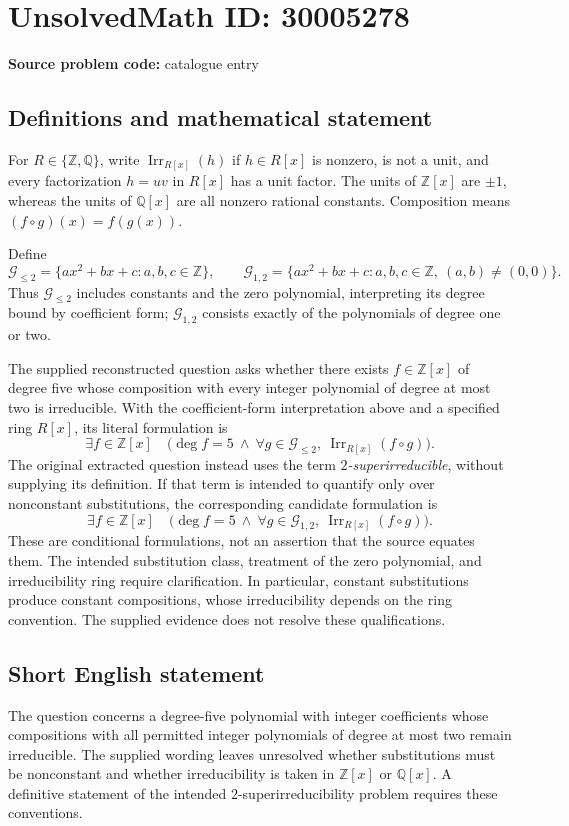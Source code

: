 \documentclass[11pt]{article}
\newcommand{\Z}{\mathbb{Z}}
\newcommand{\Q}{\mathbb{Q}}
\begin{document}
\section*{UnsolvedMath ID: 30005278}
\textbf{Source problem code:} catalogue entry
\subsection{Definitions and mathematical statement}
For \(R\in\{\Z,\Q\}\), write \(\operatorname{Irr}_{R[x]}(h)\) if \(h\in R[x]\) is nonzero, is not a unit, and every factorization \(h=uv\) in \(R[x]\) has a unit factor. The units of \(\Z[x]\) are \(\pm1\), whereas the units of \(\Q[x]\) are all nonzero rational constants. Composition means \((f\circ g)(x)=f(g(x))\).

Define
\[
\mathcal G_{\leq2}=\{ax^2+bx+c:a,b,c\in\Z\},\qquad
\mathcal G_{1,2}=\{ax^2+bx+c:a,b,c\in\Z,\ (a,b)\ne(0,0)\}.
\]
Thus \(\mathcal G_{\leq2}\) includes constants and the zero polynomial, interpreting its degree bound by coefficient form; \(\mathcal G_{1,2}\) consists exactly of the polynomials of degree one or two.

The supplied reconstructed question asks whether there exists \(f\in\Z[x]\) of degree five whose composition with every integer polynomial of degree at most two is irreducible. With the coefficient-form interpretation above and a specified ring \(R[x]\), its literal formulation is
\[
\exists f\in\Z[x]\quad
\bigl(\deg f=5\ \land\
\forall g\in\mathcal G_{\leq2},\
\operatorname{Irr}_{R[x]}(f\circ g)\bigr).
\]
The original extracted question instead uses the term \emph{\(2\)-superirreducible}, without supplying its definition. If that term is intended to quantify only over nonconstant substitutions, the corresponding candidate formulation is
\[
\exists f\in\Z[x]\quad
\bigl(\deg f=5\ \land\
\forall g\in\mathcal G_{1,2},\
\operatorname{Irr}_{R[x]}(f\circ g)\bigr).
\]
These are conditional formulations, not an assertion that the source equates them. The intended substitution class, treatment of the zero polynomial, and irreducibility ring require clarification. In particular, constant substitutions produce constant compositions, whose irreducibility depends on the ring convention. The supplied evidence does not resolve these qualifications.
\subsection{Short English statement}
The question concerns a degree-five polynomial with integer coefficients whose compositions with all permitted integer polynomials of degree at most two remain irreducible. The supplied wording leaves unresolved whether substitutions must be nonconstant and whether irreducibility is taken in \(\Z[x]\) or \(\Q[x]\). A definitive statement of the intended \(2\)-superirreducibility problem requires these conventions.
\end{document}
